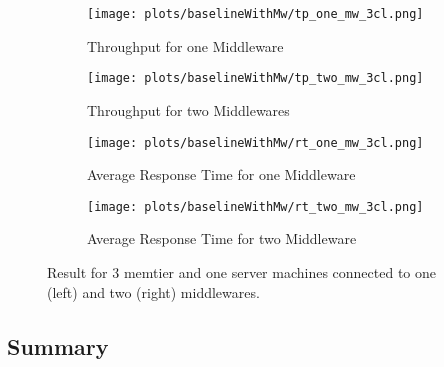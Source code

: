 \documentclass[11pt,a4paper]{article}
\begin{document}
\begin{figure}[H]
\centering
\begin{subfigure}{.5\textwidth}
    \centering
    \texttt{[image: plots/baselineWithMw/tp\_one\_mw\_3cl.png]}
    \caption{Throughput for one Middleware}
    \label{plt:bl:tp_one_mw_3cl}
\end{subfigure}%
\begin{subfigure}{.5\textwidth}
    \centering
    \texttt{[image: plots/baselineWithMw/tp\_two\_mw\_3cl.png]}
    \caption{Throughput for two Middlewares}
    \label{plt:bl:tp_two_mw_3cl}

\end{subfigure}
\begin{subfigure}{.5\textwidth}
    \centering
    \texttt{[image: plots/baselineWithMw/rt\_one\_mw\_3cl.png]}
    \caption{Average Response Time for one Middleware }
    \label{plt:bl:rt_one_mw_3cl}
\end{subfigure}%
\begin{subfigure}{.5\textwidth}
    \centering
    \texttt{[image: plots/baselineWithMw/rt\_two\_mw\_3cl.png]}
    \caption{Average Response Time for two Middleware}
    \label{plt:bl:rt_two_mw_3cl}

\end{subfigure}
\caption{Result for 3 memtier and one server machines connected to one (left) and two (right) middlewares.}
\label{plt:bl:one_two_middleware_3cl}
\end{figure}


\subsection{Summary}
\end{document}
